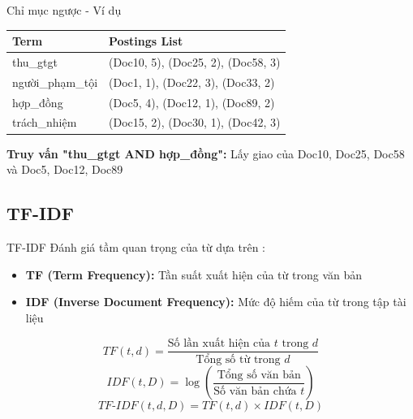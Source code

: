 \documentclass[serif, aspectratio=169]{beamer}
\newcommand{\green}[1]{\textbf{\color{codegreen}#1}}
\begin{document}
\begin{frame}{Chỉ mục ngược - Ví dụ}
\begin{table}
\centering
\small
\begin{tabular}{|l|l|}
\hline
\textbf{Term} & \textbf{Postings List} \\
\hline
thu\_gtgt & (Doc10, 5), (Doc25, 2), (Doc58, 3) \\
\hline
người\_phạm\_tội & (Doc1, 1), (Doc22, 3), (Doc33, 2) \\
\hline
hợp\_đồng & (Doc5, 4), (Doc12, 1), (Doc89, 2) \\
\hline
trách\_nhiệm & (Doc15, 2), (Doc30, 1), (Doc42, 3) \\
\hline
\end{tabular}
\end{table}

\vspace{0.3cm}
\green{Truy vấn "thu\_gtgt AND hợp\_đồng":} Lấy giao của Doc10, Doc25, Doc58 và Doc5, Doc12, Doc89
\end{frame}

\subsection{TF-IDF}
\begin{frame}{TF-IDF}
Đánh giá tầm quan trọng của từ dựa trên \cite{manning2008introduction}:
\begin{itemize}
    \item \textbf{TF (Term Frequency):} Tần suất xuất hiện của từ trong văn bản
    \item \textbf{IDF (Inverse Document Frequency):} Mức độ hiếm của từ trong tập tài liệu
\end{itemize}
\[
TF(t, d) = \frac{\text{Số lần xuất hiện của } t \text{ trong } d}{\text{Tổng số từ trong } d}
\]
\[
IDF(t, D) = \log \left( \frac{\text{Tổng số văn bản}}{\text{Số văn bản chứa } t} \right)
\]
\[
TF\text{-}IDF(t, d, D) = TF(t, d) \times IDF(t, D)
\]
\end{frame}
\end{document}
